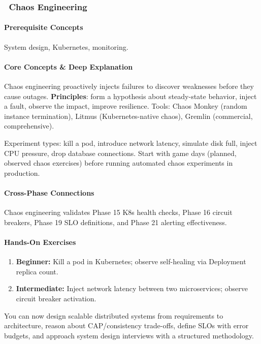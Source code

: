 \documentclass[11pt, a4paper, oneside]{report}
\newcommand{\awareness}[1]{\subsubsection{\texorpdfstring{\fcolorbox{gray!50}{gray!10}{\footnotesize\bfseries\color{gray!50!black} AWARENESS}~#1}{#1}}}
\begin{document}
\awareness{Chaos Engineering}

\paragraph{Prerequisite Concepts} System design, Kubernetes, monitoring.

\paragraph{Core Concepts \& Deep Explanation} Chaos engineering proactively injects failures to discover weaknesses before they cause outages. \textbf{Principles}: form a hypothesis about steady-state behavior, inject a fault, observe the impact, improve resilience. Tools: Chaos Monkey (random instance termination), Litmus (Kubernetes-native chaos), Gremlin (commercial, comprehensive).

Experiment types: kill a pod, introduce network latency, simulate disk full, inject CPU pressure, drop database connections. Start with game days (planned, observed chaos exercises) before running automated chaos experiments in production.

\paragraph{Cross-Phase Connections} Chaos engineering validates Phase 15 K8s health checks, Phase 16 circuit breakers, Phase 19 SLO definitions, and Phase 21 alerting effectiveness.

\paragraph{Hands-On Exercises}
\begin{enumerate}[leftmargin=*]
\item \textbf{Beginner:} Kill a pod in Kubernetes; observe self-healing via Deployment replica count.
\item \textbf{Intermediate:} Inject network latency between two microservices; observe circuit breaker activation.
\end{enumerate}

\begin{microcheckpoint}
You can now design scalable distributed systems from requirements to architecture, reason about CAP/consistency trade-offs, define SLOs with error budgets, and approach system design interviews with a structured methodology.
\end{microcheckpoint}
\end{document}
